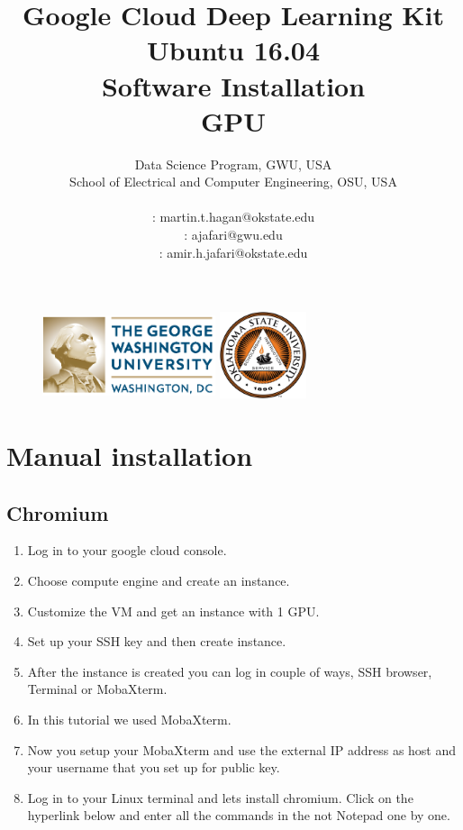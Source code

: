\documentclass[12pt]{article}
\title{\textbf{Google Cloud Deep Learning Kit\\ Ubuntu 16.04 \\ Software Installation\\ GPU }}%
\author{Data Science Program, GWU, USA \\
School of Electrical and Computer Engineering, OSU, USA\\
\vspace{1cm}\\
\Letter : martin.t.hagan@okstate.edu\\
\Letter : ajafari@gwu.edu\\
\Letter : amir.h.jafari@okstate.edu  }
\begin{document}
\begin{figure}
\centering \includegraphics[width=2in, height=1in]{fig/GW_logo.eps}\hfill
\centering \includegraphics[width=1in, height=1in]{fig/logo1.eps}\hfill
\end{figure}

\maketitle
\newpage
\tableofcontents
\newpage

\section{Manual installation}
\subsection{Chromium}

\begin{enumerate}
  \item Log in to your google cloud console.
  \item Choose compute engine and create an instance.
  \item Customize the VM and get an instance with 1 GPU.
  \item Set up your SSH key and then create instance.
  \item After the instance is created you can log in couple of ways, SSH browser, Terminal or MobaXterm.
  \item In this tutorial we used MobaXterm.
  \item Now you setup your MobaXterm and use the external IP address as host and your username that you set up for public key.
  \item Log in to your Linux terminal and lets install chromium. Click on the hyperlink below and enter all the commands in the not Notepad one by one.
\end{enumerate}
\end{document}
